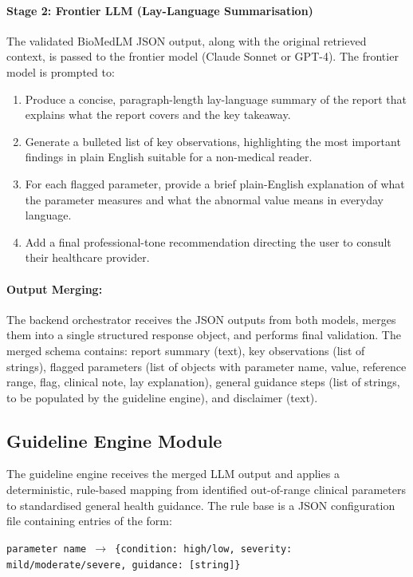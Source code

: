\paragraph{Stage 2: Frontier LLM (Lay-Language Summarisation)}
The validated BioMedLM JSON output, along with the original retrieved context, is passed to the frontier model (Claude Sonnet or GPT-4). The frontier model is prompted to:

\begin{enumerate}
    \item Produce a concise, paragraph-length lay-language summary of the report that explains what the report covers and the key takeaway.
    \item Generate a bulleted list of key observations, highlighting the most important findings in plain English suitable for a non-medical reader.
    \item For each flagged parameter, provide a brief plain-English explanation of what the parameter measures and what the abnormal value means in everyday language.
    \item Add a final professional-tone recommendation directing the user to consult their healthcare provider.
\end{enumerate}

\paragraph{Output Merging:}
The backend orchestrator receives the JSON outputs from both models, merges them into a single structured response object, and performs final validation. The merged schema contains: report summary (text), key observations (list of strings), flagged parameters (list of objects with parameter name, value, reference range, flag, clinical note, lay explanation), general guidance steps (list of strings, to be populated by the guideline engine), and disclaimer (text).

\subsection{Guideline Engine Module}
The guideline engine receives the merged LLM output and applies a deterministic, rule-based mapping from identified out-of-range clinical parameters to standardised general health guidance. The rule base is a JSON configuration file containing entries of the form:

\begin{center}
\texttt{parameter name $\rightarrow$ \{condition: high/low, severity: mild/moderate/severe, guidance: [string]\}}
\end{center}

